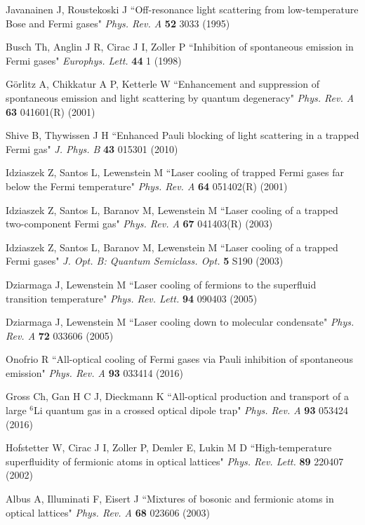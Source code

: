 \documentclass[pra,letterpaper,twocolumn,showpacs,superscriptaddress]{revtex4}
\begin{document}
\begin{thebibliography}{300}
 Javanainen J, Roustekoski J 
``Off-resonance light scattering from low-temperature Bose and Fermi gases"
{\it Phys. Rev. A} \textbf{52} 3033 (1995)

 Busch Th, Anglin J R, Cirac J I, Zoller P 
``Inhibition of spontaneous emission in Fermi gases" {\it Europhys. Lett.} \textbf{44} 1 (1998)

 G\"orlitz A, Chikkatur A P, Ketterle W 
``Enhancement and suppression of spontaneous emission and light scattering by quantum degeneracy"
{\it Phys. Rev. A} \textbf{63} 041601(R) (2001)

 Shive B, Thywissen J H
``Enhanced Pauli blocking of light scattering in a trapped Fermi gas" {\it J. Phys. B} \textbf{43} 015301 (2010)

 Idziaszek Z, Santos L, Lewenstein M 
``Laser cooling of trapped Fermi gases far below the Fermi temperature"
{\it Phys. Rev. A} \textbf{64} 051402(R) (2001)

 Idziaszek Z, Santos L, Baranov M, Lewenstein M 
``Laser cooling of a trapped two-component Fermi gas"
{\it Phys. Rev. A} \textbf{67} 041403(R) (2003)

 Idziaszek Z, Santos L, Baranov M, Lewenstein M 
``Laser cooling of a trapped Fermi gases" {\it J. Opt. B: Quantum Semiclass. Opt.} \textbf{5} S190 (2003)

 Dziarmaga J, Lewenstein M ``Laser cooling of fermions to the superfluid transition temperature"
{\it Phys. Rev. Lett.} \textbf{94} 090403 (2005)

  Dziarmaga J, Lewenstein M
``Laser cooling down to molecular condensate" {\it Phys. Rev. A} \textbf{72} 033606 (2005)

 Onofrio R
``All-optical cooling of Fermi gases via Pauli inhibition of spontaneous emission" {\it Phys. Rev. A} \textbf{93} 033414 (2016)

 Gross Ch, Gan H C J, Dieckmann K
``All-optical production and transport of a large ${}^6$Li quantum gas in a crossed optical dipole trap"
{\it Phys. Rev. A} \textbf{93} 053424 (2016)

 Hofstetter W, Cirac J I, Zoller P, Demler E, Lukin M D 
``High-temperature superfluidity of fermionic atoms in optical lattices"
{\it Phys. Rev. Lett.} \textbf{89} 220407 (2002)

 Albus A, Illuminati F, Eisert J ``Mixtures of bosonic and fermionic atoms in optical lattices"
{\it Phys. Rev. A} \textbf{68} 023606 (2003)


\end{thebibliography}
\end{document}
